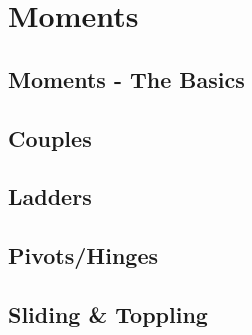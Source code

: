 \documentclass[../maths.tex]{subfiles}
\begin{document}
\chapter{Moments}
\section{Moments - The Basics}
\section{Couples}
\section{Ladders}
\section{Pivots/Hinges}
\section{Sliding \& Toppling}
\end{document}
